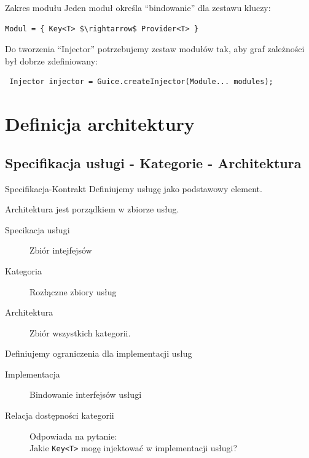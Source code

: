 \documentclass[smaller]{beamer}
\begin{document}
\begin{frame}[fragile]{Zakres modułu}
Jeden moduł określa ``bindowanie'' dla zestawu kluczy:
\begin{lstlisting}[mathescape]
Modul = { Key<T> $\rightarrow$ Provider<T> }
\end{lstlisting}


Do tworzenia ``Injector'' potrzebujemy zestaw modułów tak, aby graf zależności był dobrze zdefiniowany:
\begin{lstlisting}
 Injector injector = Guice.createInjector(Module... modules);
\end{lstlisting}


\end{frame}

\section{Definicja architektury}
\subsection{Specifikacja usługi - Kategorie - Architektura}
\begin{frame}{Specifikacja-Kontrakt}
Definiujemy usługę jako podstawowy element. 

Architektura jest porządkiem w zbiorze usług.

\begin{description}
 \item[Specikacja usługi] Zbiór intejfejsów
 \item[Kategoria] Rozłączne zbiory usług 
 \item[Architektura] Zbiór wszystkich kategorii.
\end{description}

\pause
Definiujemy ograniczenia dla implementacji usług

\begin{description}
 \item[Implementacja] Bindowanie interfejsów usługi
 \item[Relacja dostępności kategorii] Odpowiada na pytanie: \hfill \\
 Jakie \lstinline|Key<T>| mogę injektować w implementacji usługi?
\end{description}
\end{frame}
\end{document}
